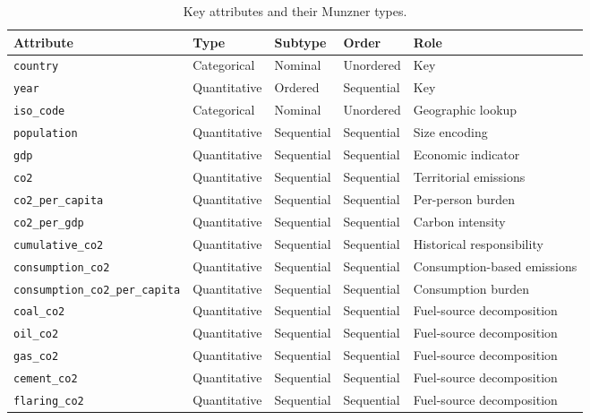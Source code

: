 \documentclass[10pt]{article}
\begin{document}
\begin{table}[h]
\caption{Key attributes and their Munzner types.}
\label{tab:attributes}
\begin{center}
\begin{tabular}{lllll}
\toprule
\textbf{Attribute} & \textbf{Type} & \textbf{Subtype} & \textbf{Order} & \textbf{Role} \\
\midrule
\texttt{country}                      & Categorical  & Nominal   & Unordered  & Key \\
\texttt{year}                         & Quantitative & Ordered   & Sequential & Key \\
\texttt{iso\_code}                    & Categorical  & Nominal   & Unordered  & Geographic lookup \\
\texttt{population}                   & Quantitative & Sequential & Sequential & Size encoding \\
\texttt{gdp}                          & Quantitative & Sequential & Sequential & Economic indicator \\
\texttt{co2}                          & Quantitative & Sequential & Sequential & Territorial emissions \\
\texttt{co2\_per\_capita}             & Quantitative & Sequential & Sequential & Per-person burden \\
\texttt{co2\_per\_gdp}                & Quantitative & Sequential & Sequential & Carbon intensity \\
\texttt{cumulative\_co2}              & Quantitative & Sequential & Sequential & Historical responsibility \\
\texttt{consumption\_co2}             & Quantitative & Sequential & Sequential & Consumption-based emissions \\
\texttt{consumption\_co2\_per\_capita}& Quantitative & Sequential & Sequential & Consumption burden \\
\texttt{coal\_co2}                    & Quantitative & Sequential & Sequential & Fuel-source decomposition \\
\texttt{oil\_co2}                     & Quantitative & Sequential & Sequential & Fuel-source decomposition \\
\texttt{gas\_co2}                     & Quantitative & Sequential & Sequential & Fuel-source decomposition \\
\texttt{cement\_co2}                  & Quantitative & Sequential & Sequential & Fuel-source decomposition \\
\texttt{flaring\_co2}                 & Quantitative & Sequential & Sequential & Fuel-source decomposition \\

\end{tabular}
\end{center}
\end{table}
\end{document}
